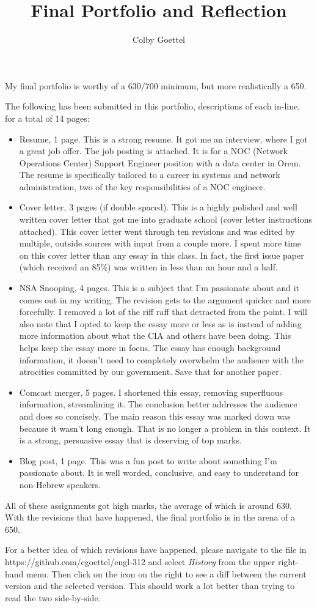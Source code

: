 \documentclass{article}
\title{Final Portfolio and Reflection}
\author{Colby Goettel}
\begin{document}
\maketitle

My final portfolio is worthy of a $630/700$ minimum, but more realistically a 650.

The following has been submitted in this portfolio, descriptions of each in-line, for a total of 14 pages:
\begin{itemize}
    \item Resume, 1 page. This is a strong resume. It got me an interview, where I got a great job offer. The job posting is attached. It is for a NOC (Network Operations Center) Support Engineer position with a data center in Orem. The resume is specifically tailored to a career in systems and network administration, two of the key responsibilities of a NOC engineer.
    \item Cover letter, 3 pages (if double spaced). This is a highly polished and well written cover letter that got me into graduate school (cover letter instructions attached). This cover letter went through ten revisions and was edited by multiple, outside sources with input from a couple more. I spent more time on this cover letter than any essay in this class. In fact, the first issue paper (which received an 85\%) was written in less than an hour and a half.
    \item NSA Snooping, 4 pages. This is a subject that I'm passionate about and it comes out in my writing. The revision gets to the argument quicker and more forcefully. I removed a lot of the riff raff that detracted from the point. I will also note that I opted to keep the essay more or less as is instead of adding more information about what the CIA and others have been doing. This helps keep the essay more in focus. The essay has enough background information, it doesn't need to completely overwhelm the audience with the atrocities committed by our government. Save that for another paper.
    \item Comcast merger, 5 pages. I shortened this essay, removing superfluous information, streamlining it. The conclusion better addresses the audience and does so concisely. The main reason this essay was marked down was because it wasn't long enough. That is no longer a problem in this context. It is a strong, persuasive essay that is deserving of top marks.
    \item Blog post, 1 page. This was a fun post to write about something I'm passionate about. It is well worded, conclusive, and easy to understand for non-Hebrew speakers.
\end{itemize}

All of these assignments got high marks, the average of which is around 630. With the revisions that have happened, the final portfolio is in the arena of a 650.

For a better idea of which revisions have happened, please navigate to the file in https://github.com/cgoettel/engl-312 and select \textit{History} from the upper right-hand menu. Then click on the icon on the right to see a diff between the current version and the selected version. This should work a lot better than trying to read the two side-by-side.
\end{document}

